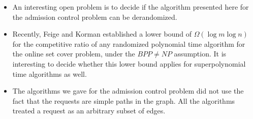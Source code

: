 \documentclass{sig-alternate}
\begin{document}
\begin{itemize}
    \item An interesting open problem is to decide if the algorithm presented here
    for the admission control problem can be derandomized.
    \item Recently, Feige and Korman established a lower bound of $\Omega(\log m \log n)$
    for the competitive ratio of any randomized polynomial time algorithm for the
    online set cover problem, under the $BPP \neq NP$ assumption. It is interesting to
    decide whether this lower bound applies for superpolynomial time algorithms as well.
    \item The algorithms we gave for the admission control problem did not use
    the fact that the requests are simple paths in the graph. All
    the algorithms treated a request as an arbitrary subset of
    edges.

\end{itemize}
\end{document}
